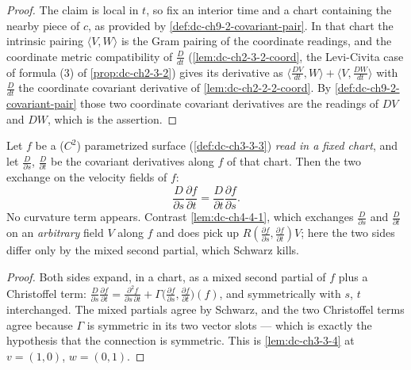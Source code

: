\begin{proof}
  \leanok
  \sketch
  The claim is local in $t$, so fix an interior time and a chart containing the nearby
  piece of $c$, as provided by \cref{def:dc-ch9-2-covariant-pair}. In that chart the
  intrinsic pairing $\langle V,W\rangle$ is the Gram pairing of the coordinate readings,
  and the coordinate metric compatibility of $\frac{D}{dt}$ (\cref{lem:dc-ch2-3-2-coord},
  the Levi-Civita case of formula (3) of \cref{prop:dc-ch2-3-2}) gives its derivative as
  $\langle\frac{DV}{dt},W\rangle+\langle V,\frac{DW}{dt}\rangle$ with $\frac{D}{dt}$ the
  coordinate covariant derivative of \cref{lem:dc-ch2-2-2-coord}. By
  \cref{def:dc-ch9-2-covariant-pair} those two coordinate covariant derivatives are the
  readings of $DV$ and $DW$, which is the assertion.
\end{proof}
\begin{lemma}
  \label{lem:dc-ch9-2-4-symmetry}
  \leanok
  Let $f$ be a ($C^2$) parametrized surface (\cref{def:dc-ch3-3-3}) \emph{read in a fixed
  chart}, and let $\frac{D}{\partial s}$, $\frac{D}{\partial t}$ be the covariant
  derivatives along $f$ of that chart. Then the two exchange on the velocity fields of $f$:
  $$
  \frac{D}{\partial s}\frac{\partial f}{\partial t}
    = \frac{D}{\partial t}\frac{\partial f}{\partial s}.
  $$
  No curvature term appears. Contrast \cref{lem:dc-ch4-4-1}, which exchanges
  $\frac{D}{\partial s}$ and $\frac{D}{\partial t}$ on an \emph{arbitrary} field $V$ along
  $f$ and does pick up $R(\frac{\partial f}{\partial s},\frac{\partial f}{\partial t})V$;
  here the two sides differ only by the mixed second partial, which Schwarz kills.

\end{lemma}
\begin{proof}
  \leanok
  \sketch
  Both sides expand, in a chart, as a mixed second partial of $f$ plus a Christoffel term:
  $\frac{D}{\partial s}\frac{\partial f}{\partial t}
   = \frac{\partial^2 f}{\partial s\,\partial t}
     + \Gamma\big(\frac{\partial f}{\partial s},\frac{\partial f}{\partial t}\big)(f)$, and
  symmetrically with $s$, $t$ interchanged. The mixed partials agree by Schwarz, and the two
  Christoffel terms agree because $\Gamma$ is symmetric in its two vector slots --- which is
  exactly the hypothesis that the connection is symmetric. This is \cref{lem:dc-ch3-3-4} at
  $v=(1,0)$, $w=(0,1)$.
\end{proof}
